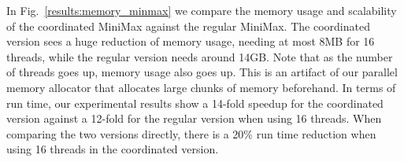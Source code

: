 In Fig.~\ref{results:memory_minmax} we compare the memory usage and scalability
of the coordinated MiniMax against the regular MiniMax. The coordinated version
sees a huge reduction of memory usage, needing at most 8MB for 16 threads, while
the regular version needs around 14GB. Note that as the number of threads goes
up, memory usage also goes up. This is an artifact of our parallel memory
allocator that allocates large chunks of memory beforehand.
In terms of run time, our experimental results show a 14-fold speedup for the
coordinated version against a 12-fold for the regular version when using 16
threads. When comparing the two versions directly, there is a 20\% run time
reduction when using 16 threads in the coordinated version.
